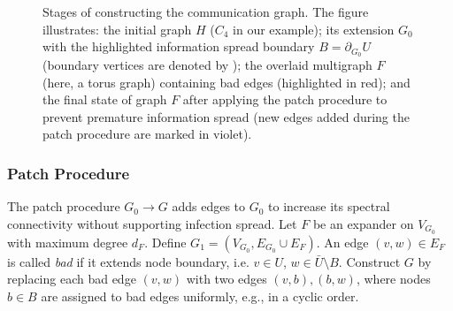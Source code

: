\documentclass[a4paper,USenglish,cleveref, autoref, thm-restate]{lipics-v2021}
\begin{document}
\begin{figure}[h!]
\caption{Stages of constructing the communication graph. The figure illustrates: the initial graph $H$ ($C_4$ in our example); its extension $G_0$ with the highlighted information spread boundary $B = \partial_{G_0} U$ (boundary vertices are denoted by ); the overlaid multigraph $F$ (here, a torus graph) containing bad edges (highlighted in {\color[HTML]{FF0000}red}); and the final state of graph $F$ after applying the patch procedure to prevent premature information spread (new edges added during the patch procedure are marked in {\color[HTML]{9013FE}violet}).}
\label{fig:u}
\end{figure}



\subsubsection{Patch Procedure}
The patch procedure $G_0 \to G$ adds edges to $G_0$ to increase its spectral connectivity without supporting infection spread. 
  Let $F$ be an expander on $V_{G_0}$ with maximum degree $d_F$.
  Define $G_1 = (V_{G_0}, E_{G_0} \cup E_F)$.
  An edge $(v, w) \in E_F$ is called \textit{bad} if it extends node boundary, i.e. $v \in U$, $w \in \bar U \setminus B$.
  Construct $G$ by replacing each bad edge $(v, w)$ with two edges $(v, b), (b, w)$, where nodes $b \in B$ are assigned to bad edges uniformly, e.g., in a cyclic order.
\end{document}
